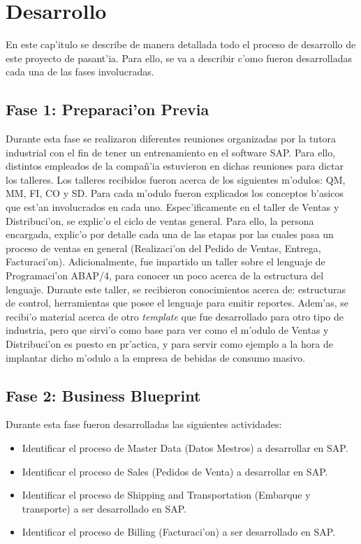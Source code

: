 \chapter{Desarrollo} \label{chap:desarrollo}
	En este cap'itulo se describe de manera detallada todo el proceso de desarrollo de este proyecto de pasant'ia. Para ello, se va a describir c'omo fueron desarrolladas cada una de las fases involucradas.

\section{Fase 1: Preparaci'on Previa}
	Durante esta fase se realizaron diferentes reuniones organizadas por la tutora industrial con el fin de tener un entrenamiento en el software SAP. Para ello, distintos empleados de la compa\~n'ia estuvieron en dichas reuniones para dictar los talleres.
\newline
\newline
	Los talleres recibidos fueron acerca de los siguientes m'odulos: QM, MM, FI, CO y SD.
\indent Para cada m'odulo fueron explicados los conceptos b'asicos que est'an involucrados en cada uno. Espec'ificamente en el taller de Ventas y Distribuci'on, se explic'o el ciclo de ventas general. Para ello, la persona encargada, explic'o por detalle cada una de las etapas por las cuales pasa un proceso de ventas en general (Realizaci'on del Pedido de Ventas, Entrega, Facturaci'on). 
\newline
\newline
\indent Adicionalmente, fue impartido un taller sobre el lenguaje de Programaci'on ABAP/4, para conocer un poco acerca de la estructura del lenguaje. Durante este taller, se recibieron conocimientos acerca de: estructuras de control, herramientas que posee el lenguaje para emitir reportes. 
\newline
\newline
\indent Adem'as, se recibi'o material acerca de otro \textit{template} que fue desarrollado para otro tipo de industria, pero que sirvi'o como base para ver como el m'odulo de Ventas y Distribuci'on es puesto en pr'actica, y para servir como ejemplo a la hora de implantar dicho m'odulo a la empresa de bebidas de consumo masivo.
	
\section{Fase 2: Business Blueprint}
	Durante esta fase fueron desarrolladas las siguientes actividades:
\begin{itemize}
\item Identificar el proceso de Master Data (Datos Mestros) a desarrollar en SAP.
\item Identificar el proceso de Sales (Pedidos de Venta) a desarrollar en SAP.
\item Identificar el proceso de Shipping and Transportation (Embarque y transporte) a ser desarrollado en SAP.
\item Identificar el proceso de Billing (Facturaci'on) a ser desarrollado en SAP.
\end{itemize}

